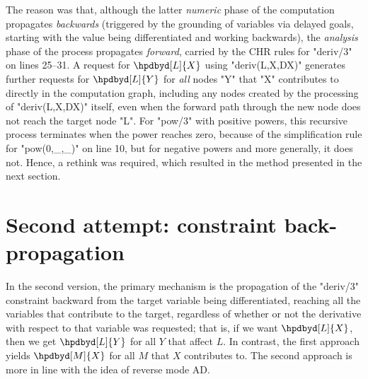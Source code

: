 The reason was that, although the latter \emph{numeric} phase of the computation
propagates \emph{backwards} (triggered by the grounding of variables via 
delayed goals, starting with the value being differentiated and working backwards),
the \emph{analysis} phase of the process propagates \emph{forward}, carried
by the CHR rules for "deriv/3" on lines 25--31. 
A request for $\hpdbyd[L]{X}$ using "deriv(L,X,DX)" generates further requests
for $\hpdbyd[L]{Y}$ for \emph{all} nodes "Y" that "X" contributes to directly in the
computation graph, including any nodes created by
the processing of "deriv(L,X,DX)" itself, even when the forward path through the
new node does not reach the target node "L". For "pow/3" with positive powers, this
recursive process terminates when the power reaches zero, because of the simplification
rule for "pow(0,_,_)" on line 10, but for negative powers and more generally, it does not.
Hence, a rethink was required, which resulted in the method presented in the
next section.

\section{Second attempt: constraint back-propagation}
In the second version, the primary mechanism is the propagation of the "deriv/3" 
constraint backward from the target variable being differentiated, reaching all the 
variables that contribute to the target, regardless of whether or not the derivative 
with respect to that variable was requested; that is, if we want $\hpdbyd[L]{X}$, then
we get $\hpdbyd[L]{Y}$ for all $Y$ that affect $L$. In contrast, the first approach
yields $\hpdbyd[M]{X}$ for all $M$ that $X$ contributes to. The second approach is
more in line with the idea of reverse mode AD.

